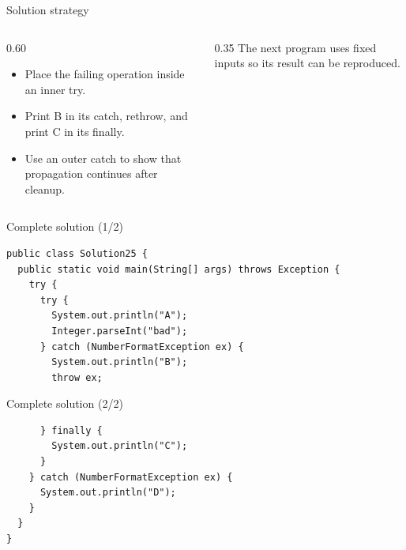 \documentclass[10pt,aspectratio=169]{beamer}
\begin{document}
\begin{frame}[fragile,t]{Solution strategy}
\begin{columns}[T,onlytextwidth]\begin{column}{0.60\textwidth}
\begin{itemize}
\item Place the failing operation inside an inner try.
\item Print B in its catch, rethrow, and print C in its finally.
\item Use an outer catch to show that propagation continues after cleanup.
\end{itemize}
\end{column}\begin{column}{0.35\textwidth}\small
The next program uses fixed inputs so its result can be reproduced.
\end{column}\end{columns}
\end{frame}

\begin{frame}[fragile,t]{Complete solution (1/2)}
\begin{lstlisting}
public class Solution25 {
  public static void main(String[] args) throws Exception {
    try {
      try {
        System.out.println("A");
        Integer.parseInt("bad");
      } catch (NumberFormatException ex) {
        System.out.println("B");
        throw ex;
\end{lstlisting}
\end{frame}

\begin{frame}[fragile,t]{Complete solution (2/2)}
\begin{lstlisting}
      } finally {
        System.out.println("C");
      }
    } catch (NumberFormatException ex) {
      System.out.println("D");
    }
  }
}
\end{lstlisting}
\end{frame}
\end{document}
